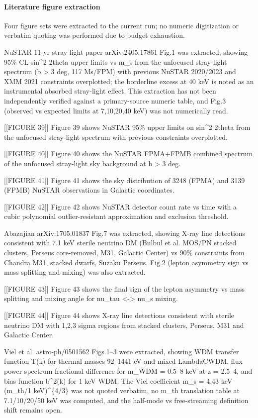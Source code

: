 \documentclass[11pt,a4paper]{article}
\begin{document}
\paragraph{Literature figure extraction}
Four figure sets were extracted to the current run; no numeric digitization or verbatim quoting was performed due to budget exhaustion.

NuSTAR 11-yr stray-light paper arXiv:2405.17861 Fig.1 was extracted, showing 95\% CL sin\textasciicircum{}2 2theta upper limits vs m\_s from the unfocused stray-light spectrum (\textbar{}b\textbar{} \textgreater{} 3 deg, 117 Ms/FPM) with previous NuSTAR 2020/2023 and XMM 2021 constraints overplotted; the borderline excess at 40 keV is noted as an instrumental absorbed stray-light effect. This extraction has not been independently verified against a primary-source numeric table, and Fig.3 (observed vs expected limits at 7,10,20,40 keV) was not numerically read.

[[FIGURE 39]] Figure 39 shows NuSTAR 95\% upper limits on sin\textasciicircum{}2 2theta from the unfocused stray-light spectrum with previous constraints overplotted.

[[FIGURE 40]] Figure 40 shows the NuSTAR FPMA+FPMB combined spectrum of the unfocused stray-light sky background at \textbar{}b\textbar{} \textgreater{} 3 deg.

[[FIGURE 41]] Figure 41 shows the sky distribution of 3248 (FPMA) and 3139 (FPMB) NuSTAR observations in Galactic coordinates.

[[FIGURE 42]] Figure 42 shows NuSTAR detector count rate vs time with a cubic polynomial outlier-resistant approximation and exclusion threshold.

Abazajian arXiv:1705.01837 Fig.7 was extracted, showing X-ray line detections consistent with 7.1 keV sterile neutrino DM (Bulbul et al. MOS/PN stacked clusters, Perseus core-removed, M31, Galactic Center) vs 90\% constraints from Chandra M31, stacked dwarfs, Suzaku Perseus. Fig.2 (lepton asymmetry sign vs mass splitting and mixing) was also extracted.

[[FIGURE 43]] Figure 43 shows the final sign of the lepton asymmetry vs mass splitting and mixing angle for nu\_tau \textless{}-\textgreater{} nu\_s mixing.

[[FIGURE 44]] Figure 44 shows X-ray line detections consistent with sterile neutrino DM with 1,2,3 sigma regions from stacked clusters, Perseus, M31 and Galactic Center.

Viel et al. astro-ph/0501562 Figs.1--3 were extracted, showing WDM transfer function T(k) for thermal masses 92--1441 eV and mixed LambdaCWDM, flux power spectrum fractional difference for m\_WDM = 0.5--8 keV at z = 2.5--4, and bias function b\textasciicircum{}2(k) for 1 keV WDM. The Viel coefficient m\_s = 4.43 keV (m\_th/1 keV)\textasciicircum{}\{4/3\} was not quoted verbatim, no m\_th translation table at 7.1/10/20/50 keV was computed, and the half-mode vs free-streaming definition shift remains open.
\end{document}
